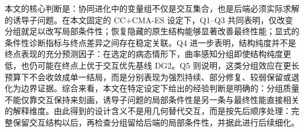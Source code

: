 本文的核心判断是：协同进化中的变量组不仅是交互集合，也是后端必须实际求解的诱导子问题。在本文固定的 CC+CMA-ES 设定下，Q1--Q3 共同表明，仅改变分组就足以改写局部条件性；恢复隐藏的原生结构能够显著改善最终性能；显式的条件性诊断指标与终点差异之间存在稳定关联。Q4 进一步表明，结构纯度并不是终点表现的充分预测因子：在选定的病态情形下，曲率感知分组即使结构纯度更低，也仍可能在终点上优于交互优先基线 DG2。Q5 则说明，这类分组效应在更长预算下不会收敛成单一结局，而是分别表现为强烈持续、部分修复、较弱保留或退化为边界证据。综合来看，本文在特定设定下给出的经验判断是明确的：分组质量不能仅靠交互保持来刻画，诱导子问题的局部条件性是另一条与最终性能直接相关的解释维度。由此得到的设计含义不是用几何替代交互，而是按先后顺序处理：完整保留交互结构以后，再检查分组留给后端的局部条件性，并据此进行后续细化。
